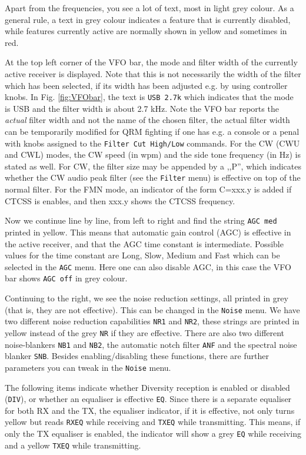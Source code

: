 \documentclass[12pt]{book}
\def\rett#1{\texttt{\color{red}#1}}
\def\bltt#1{\texttt{\color{blue}#1}}
\begin{document}
Apart from the frequencies, you see a lot  of text, most in
light grey colour. As a general rule, a text  in grey
colour indicates a feature that is currently disabled,
while features currently active are normally shown in
yellow and sometimes in red.

At the top left  corner of the VFO bar, the mode and
filter width of the currently active receiver is displayed.
Note that this is not necessarily the width of the filter
which has been selected, if its width has been adjusted
e.g. by using controller knobs.
In Fig. \ref{fig:VFObar}, the text is \rett{USB 2.7k}
which indicates that the  mode
is USB and the filter width is about 2.7 kHz.
Note the VFO bar reports the
\textit{actual} filter width and not the name of the chosen filter,
the actual filter width can be temporarily modified for QRM fighting
if one has e.g. a console or a penal with knobs assigned to the \bltt{Filter Cut High/Low}
commands.
For the CW (CWU and CWL) modes, the CW speed (in wpm) and the side tone
frequency (in Hz) is stated as well. For CW, the filter size may be appended
by a ,,P'', which indicates whether the CW audio peak filter (see the
\bltt{Filter} menu) is effective on top of the normal filter.
For the FMN mode, an indicator of the form C=xxx.y is added if
CTCSS is enables, and then xxx.y shows the CTCSS frequency.

Now we continue line by line, from left to right and find
the string \rett{AGC med} printed in yellow. This means
that automatic gain control (AGC)  is effective  in the
active receiver, and that the AGC time constant is
intermediate. Possible values for the time constant
are Long, Slow, Medium and Fast which can be selected
in the \bltt{AGC} menu. Here one can  also disable AGC,
in this case the VFO bar shows \rett{AGC off} in grey
colour.

Continuing to the right, we see the noise reduction settings,
all printed in grey (that is, they are not effective). This
can be changed in the \bltt{Noise} menu. We have two different
noise reduction capabilities \rett{NR1} and \rett{NR2}, these
strings are printed in yellow instead of the grey \rett{NR} if
they are effective. There are also two different noise-blankers
\rett{NB1} and \rett{NB2}, the automatic notch  filter
\rett{ANF} and the spectral  noise blanker \rett{SNB}.
Besides enabling/disabling these functions, there are  further parameters
you can tweak in the \bltt{Noise} menu.

The following items indicate whether Diversity reception is enabled or disabled
(\rett{DIV}), or whether an equaliser is effective \rett{EQ}.
Since there is a separate equaliser for both RX and the TX,
the equaliser indicator, if it is effective, not only turns yellow
but reads \rett{RXEQ} while receiving and \rett{TXEQ} while
transmitting. This means, if only the TX equaliser is enabled,
the indicator will show a  grey \rett{EQ} while receiving
and a yellow \rett{TXEQ}  while  transmitting.
\end{document}
